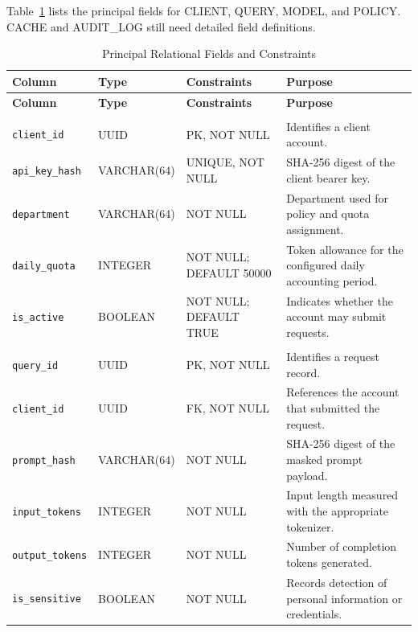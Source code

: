 Table~\ref{tab:data_dict_table} lists the principal fields for CLIENT, QUERY, MODEL, and POLICY. CACHE and AUDIT\_LOG still need detailed field definitions.
\begingroup
\footnotesize
{}
\setlength{\parskip}{0pt}
\setlength{\tabcolsep}{3pt}
\renewcommand{\arraystretch}{1.08}
\begin{longtable}{|>{\raggedright\arraybackslash}p{3.1cm}|>{\raggedright\arraybackslash}p{2.5cm}|>{\raggedright\arraybackslash}p{3.0cm}|>{\raggedright\arraybackslash}p{6.2cm}|}
\caption{Principal Relational Fields and Constraints}\label{tab:data_dict_table}\\
\hline
\textbf{Column} & \textbf{Type} & \textbf{Constraints} & \textbf{Purpose} \\ \hline
\endfirsthead
\hline
\textbf{Column} & \textbf{Type} & \textbf{Constraints} & \textbf{Purpose} \\ \hline
\endhead
\multicolumn{4}{|c|}{\textbf{CLIENT}} \\ \hline
\texttt{client\_id} & UUID & PK, NOT NULL & Identifies a client account. \\ \hline
\texttt{api\_key\_hash} & VARCHAR(64) & UNIQUE, NOT NULL & SHA-256 digest of the client bearer key. \\ \hline
\texttt{department} & VARCHAR(64) & NOT NULL & Department used for policy and quota assignment. \\ \hline
\texttt{daily\_quota} & INTEGER & NOT NULL; DEFAULT 50000 & Token allowance for the configured daily accounting period. \\ \hline
\texttt{is\_active} & BOOLEAN & NOT NULL; DEFAULT TRUE & Indicates whether the account may submit requests. \\ \hline
\multicolumn{4}{|c|}{\textbf{QUERY}} \\ \hline
\texttt{query\_id} & UUID & PK, NOT NULL & Identifies a request record. \\ \hline
\texttt{client\_id} & UUID & FK, NOT NULL & References the account that submitted the request. \\ \hline
\texttt{prompt\_hash} & VARCHAR(64) & NOT NULL & SHA-256 digest of the masked prompt payload. \\ \hline
\texttt{input\_tokens} & INTEGER & NOT NULL & Input length measured with the appropriate tokenizer. \\ \hline
\texttt{output\_tokens} & INTEGER & NOT NULL & Number of completion tokens generated. \\ \hline
\texttt{is\_sensitive} & BOOLEAN & NOT NULL & Records detection of personal information or credentials. \\ \hline

\end{longtable}

